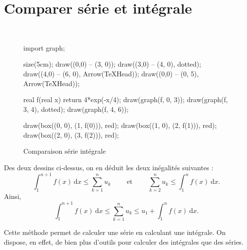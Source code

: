 \section{Comparer série et intégrale}

\begin{met}
	~
	\begin{figure}[H]
		\centering
		\begin{asy}
			import graph;

			size(5cm);
			draw((0,0) -- (3, 0));
			draw((3,0) -- (4, 0), dotted);
			draw((4,0) -- (6, 0), Arrow(TeXHead));
			draw((0,0) -- (0, 5), Arrow(TeXHead));

			real f(real x) { return 4*exp(-x/4); }
			draw(graph(f, 0, 3));
			draw(graph(f, 3, 4), dotted);
			draw(graph(f, 4, 6));

			draw(box((0, 0), (1, f(0))), red);
			draw(box((1, 0), (2, f(1))), red);
			draw(box((2, 0), (3, f(2))), red);
		\end{asy}
		\caption{Comparaison série intégrale}

	\end{figure}

	Des deux dessins ci-dessus, on en déduit les deux inégalités suivantes :
	\[
		\int_{1}^{n+1} f(x)~\mathrm{d}x \le \sum_{k=1}^{n} u_k \qquad \text{ et } \qquad \sum_{k=2}^{n} u_k \le \int_{1}^{n} f(x)~\mathrm{d}x
	.\] Ainsi, \[
		\int_{1}^{n+1} f(x)~\mathrm{d}x \le \sum_{k=1}^n u_k \le u_1 + \int_{1}^{n} f(x)~\mathrm{d}x
	.\]

	Cette méthode permet de calculer une série en calculant une intégrale. On dispose, en effet, de bien plus d'outils pour calculer des intégrales que des séries.
\end{met}

